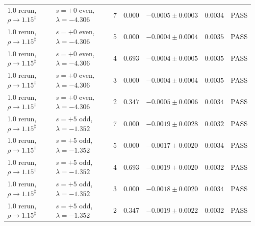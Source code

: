 \begin{tabular}{llrrlll}
1.0 rerun, $\rho\to1.15^\ddagger$ & $s=+0$ even, $\lambda=-4.306$ & 7 & $0.000$ & $-0.0005\pm0.0003$ & $0.0034$ & PASS \\
1.0 rerun, $\rho\to1.15^\ddagger$ & $s=+0$ even, $\lambda=-4.306$ & 5 & $0.000$ & $-0.0004\pm0.0004$ & $0.0035$ & PASS \\
1.0 rerun, $\rho\to1.15^\ddagger$ & $s=+0$ even, $\lambda=-4.306$ & 4 & $0.693$ & $-0.0004\pm0.0005$ & $0.0035$ & PASS \\
1.0 rerun, $\rho\to1.15^\ddagger$ & $s=+0$ even, $\lambda=-4.306$ & 3 & $0.000$ & $-0.0004\pm0.0004$ & $0.0035$ & PASS \\
1.0 rerun, $\rho\to1.15^\ddagger$ & $s=+0$ even, $\lambda=-4.306$ & 2 & $0.347$ & $-0.0005\pm0.0006$ & $0.0034$ & PASS \\
1.0 rerun, $\rho\to1.15^\ddagger$ & $s=+5$ odd, $\lambda=-1.352$ & 7 & $0.000$ & $-0.0019\pm0.0028$ & $0.0032$ & PASS \\
1.0 rerun, $\rho\to1.15^\ddagger$ & $s=+5$ odd, $\lambda=-1.352$ & 5 & $0.000$ & $-0.0017\pm0.0020$ & $0.0034$ & PASS \\
1.0 rerun, $\rho\to1.15^\ddagger$ & $s=+5$ odd, $\lambda=-1.352$ & 4 & $0.693$ & $-0.0019\pm0.0020$ & $0.0032$ & PASS \\
1.0 rerun, $\rho\to1.15^\ddagger$ & $s=+5$ odd, $\lambda=-1.352$ & 3 & $0.000$ & $-0.0018\pm0.0020$ & $0.0034$ & PASS \\
1.0 rerun, $\rho\to1.15^\ddagger$ & $s=+5$ odd, $\lambda=-1.352$ & 2 & $0.347$ & $-0.0019\pm0.0022$ & $0.0032$ & PASS \\
\bottomrule
\end{tabular}
